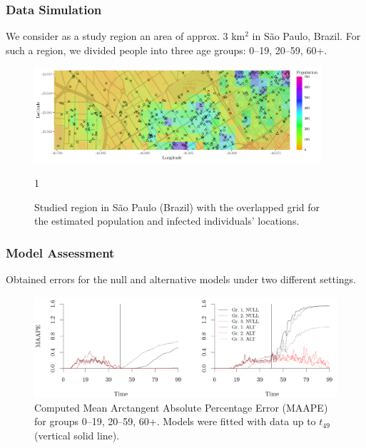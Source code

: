 \documentclass[12pt, aspectratio = 169]{beamer} %
\begin{document}
	\begin{frame}[t]
		\frametitle{Data Simulation}
		\justifying
		
		We consider as a study region an area of approx. 3 km${}^{2}$ in São Paulo, Brazil. For such a region, we divided people into three age groups: 0--19, 20--59, 60+.
		
		\begin{figure}[!ht]
			\centering\vspace{-3pt}
			\includegraphics[width = 0.95\textwidth]{Images/map.png}\vspace{-12pt}
			\caption{\justifying Studied region in  São Paulo (Brazil) with the overlapped grid for the estimated population and infected individuals' locations.}1
			\label{fig:map}
		\end{figure}
		
	\end{frame}

	\begin{frame}[t]
		\frametitle{Model Assessment}
		\justifying
		
		Obtained errors for the null and alternative models under two different settings.\vspace{-3pt}
		\begin{figure}[!ht]
			\centering
			\includegraphics[width = 1\textwidth]{Images/computed_errors.png}\vspace{-6pt}
			\caption{\justifying Computed Mean Arctangent Absolute Percentage Error (MAAPE) for groups 0--19, 20--59, 60+. Models were fitted with data up to $t_{49}$ (vertical solid line).}
			\label{fig:computederrors}
		\end{figure}
		
	\end{frame}
	
\end{document}
